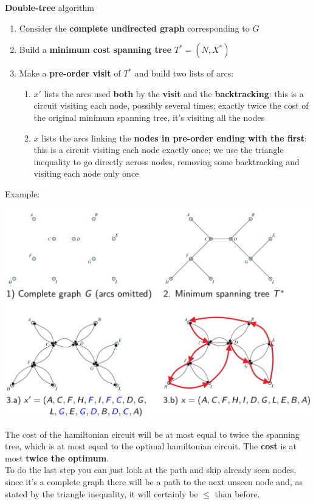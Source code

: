 \documentclass[11pt]{article}
\begin{document}
	\textbf{Double-tree} algorithm
	\begin{enumerate}
		\item Consider the \textbf{complete undirected graph} corresponding to $G$
		\item Build a \textbf{minimum cost spanning tree} $T^\ast = (N, X^\ast)$
		\item Make a \textbf{pre-order visit} of $T^\ast$ and build two lists of arcs:
		\begin{enumerate}[label=\alph*.]
			\item $x'$ lists the arcs used \textbf{both} by the \textbf{visit} and the \textbf{backtracking}: this is a circuit visiting each node, possibly several times; exactly twice the cost of the original minimum spanning tree, it's visiting all the nodes
			\item $x$ lists the arcs linking the \textbf{nodes in pre-order ending with the first}: this is a circuit visiting each node exactly once; we use the triangle inequality to go directly across nodes, removing some backtracking and visiting each node only once
		\end{enumerate}
	\end{enumerate}
	
	Example:
	\begin{center}
		\includegraphics[width=0.8\columnwidth]{img/TSTTI1}
	\end{center}
	
	\newpage
	
	The cost of the hamiltonian circuit will be at most equal to twice the spanning tree, which is at most equal to the optimal hamiltonian circuit. The \textbf{cost} is at most \textbf{twice the optimum}. \\
	
	To do the last step you can just look at the path and skip already seen nodes, since it's a complete graph there will be a path to the next unseen node and, as stated by the triangle inequality, it will certainly be $\leq$ than before. \\
	
\end{document}
